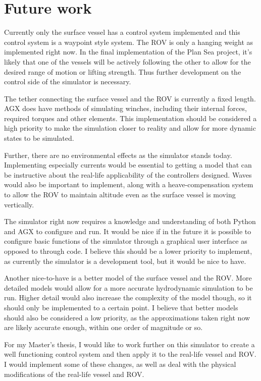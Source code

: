 \section{Future work}
Currently only the surface vessel has a control system implemented and this control system is a waypoint style system. The ROV is only a hanging weight as implemented right now. In the final implementation of the Plan Sea project, it's likely that one of the vessels will be actively following the other to allow for the desired range of motion or lifting strength. Thus further development on the control side of the simulator is necessary. 

The tether connecting the surface vessel and the ROV is currently a fixed length. AGX does have methods of simulating winches, including their internal forces, required torques and other elements. This implementation should be considered a high priority to make the simulation closer to reality and allow for more dynamic states to be simulated. 

Further, there are no environmental effects as the simulator stands today. Implementing especially currents would be essential to getting a model that can be instructive about the real-life applicability of the controllers designed. Waves would also be important to implement, along with a heave-compensation system to allow the ROV to maintain altitude even as the surface vessel is moving vertically. 

The simulator right now requires a knowledge and understanding of both Python and AGX to configure and run. It would be nice if in the future it is possible to configure basic functions of the simulator through a graphical user interface as opposed to through code. I believe this should be a lower priority to implement, as currently the simulator is a development tool, but it would be nice to have. 

Another nice-to-have is a better model of the surface vessel and the ROV. More detailed models would allow for a more accurate hydrodynamic simulation to be run. Higher detail would also increase the complexity of the model though, so it should only be implemented to a certain point. I believe that better models should also be considered a low priority, as the approximations taken right now are likely accurate enough, within one order of magnitude or so. 

For my Master's thesis, I would like to work further on this simulator to create a well functioning control system and then apply it to the real-life vessel and ROV. I would implement some of these changes, as well as deal with the physical modifications of the real-life vessel and ROV. 